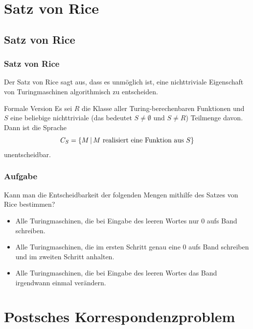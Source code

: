 \section{Satz von Rice}
\subsection{Satz von Rice}
\begin{frame}
\frametitle{Satz von Rice}
Der Satz von Rice sagt aus, dass es unmöglich ist, eine nichttriviale Eigenschaft von Turingmaschinen algorithmisch zu entscheiden.
\begin{block}{Formale Version}
Es sei $R$ die Klasse aller Turing-berechenbaren Funktionen und $S$ eine beliebige nichttriviale (das bedeutet $S \neq \emptyset$ und $S \neq R$) Teilmenge davon. Dann ist die Sprache
$$ C_S = \left\lbrace M \,\middle\vert\, M \text{ realisiert eine Funktion aus } S \right\rbrace $$
unentscheidbar. 
\end{block}
\end{frame}

\begin{frame}
\frametitle{Aufgabe}
Kann man die Entscheidbarkeit der folgenden Mengen mithilfe des Satzes von Rice bestimmen?
\begin{itemize}
\item Alle Turingmaschinen, die bei Eingabe des leeren Wortes nur $0$ aufs Band schreiben.
\item Alle Turingmaschinen, die im ersten Schritt genau eine $0$ aufs Band schreiben und im zweiten Schritt anhalten. 
\item Alle Turingmaschinen, die bei Eingabe des leeren Wortes das Band irgendwann einmal verändern.
\end{itemize}
\end{frame}

\section{Postsches Korrespondenzproblem}
